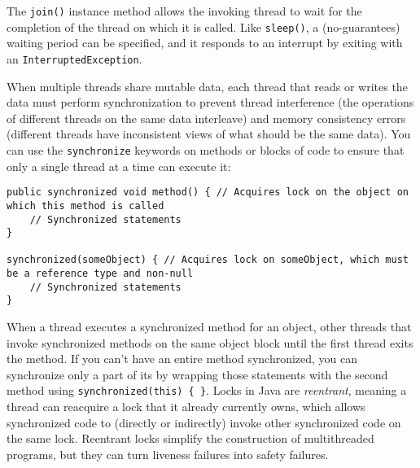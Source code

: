 \documentclass[8pt, table, xcdraw]{article}%
\begin{document}
The \lstinline{join()} instance method allows the invoking thread to wait for the completion of the thread on which it is called. Like \lstinline{sleep()}, a (no-guarantees) waiting period can be specified, and it responds to an interrupt by exiting with an \lstinline{InterruptedException}.

When multiple threads share mutable data, each thread that reads or writes the data must perform synchronization to prevent thread interference (the operations of different threads on the same data interleave) and memory consistency errors (different threads have inconsistent views of what should be the same data). You can use the \lstinline{synchronize} keywords on methods or blocks of code to ensure that only a single thread at a time can execute it:

\begin{lstlisting}
public synchronized void method() { // Acquires lock on the object on which this method is called
    // Synchronized statements
}

synchronized(someObject) { // Acquires lock on someObject, which must be a reference type and non-null
    // Synchronized statements
}
\end{lstlisting}

When a thread executes a synchronized method for an object, other threads that invoke synchronized methods on the same object block until the first thread exits the method. If you can't have an entire method synchronized, you can synchronize only a part of its by wrapping those statements with the second method using \lstinline|synchronized(this) { }|. Locks in Java are \emph{reentrant}, meaning a thread can reacquire a lock that it already currently owns, which allows synchronized code to (directly or indirectly) invoke other synchronized code on the same lock. Reentrant locks simplify the construction of multithreaded programs, but they can turn liveness failures into safety failures.
\end{document}
